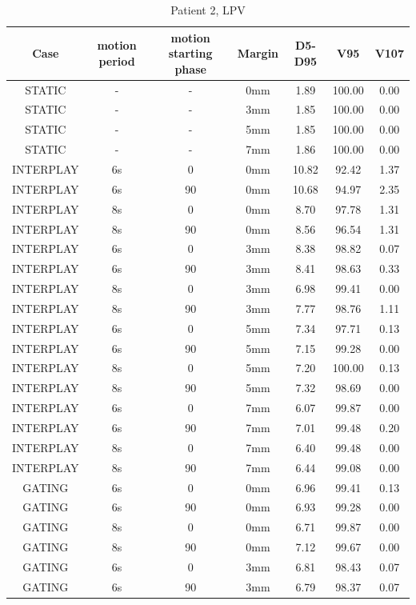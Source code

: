 \documentclass[type=dr, dr=rernat, accentcolor=tud7b,colorbacktitle, bigchapter, openright, twoside, 12pt ]{tudthesis}
\begin{document}
\begin{table}[H]
  \centering
  \caption{Patient 2, LPV}
  \begin{tabular}{|c||c|c|c||c|c|c|}
    \hline\hline
    Case & motion period & motion starting phase & Margin & D5-D95 & V95 & V107\\
    \hline 
STATIC & - & - & 0mm & 1.89 & 100.00 & 0.00 \\
STATIC & - & - & 3mm & 1.85 & 100.00 & 0.00 \\
STATIC & - & - & 5mm & 1.85 & 100.00 & 0.00 \\
STATIC & - & - & 7mm & 1.86 & 100.00 & 0.00 \\
INTERPLAY & 6s & 0 & 0mm & 10.82 & 92.42 & 1.37 \\
INTERPLAY & 6s & 90 & 0mm & 10.68 & 94.97 & 2.35 \\
INTERPLAY & 8s & 0 & 0mm & 8.70 & 97.78 & 1.31 \\
INTERPLAY & 8s & 90 & 0mm & 8.56 & 96.54 & 1.31 \\
INTERPLAY & 6s & 0 & 3mm & 8.38 & 98.82 & 0.07 \\
INTERPLAY & 6s & 90 & 3mm & 8.41 & 98.63 & 0.33 \\
INTERPLAY & 8s & 0 & 3mm & 6.98 & 99.41 & 0.00 \\
INTERPLAY & 8s & 90 & 3mm & 7.77 & 98.76 & 1.11 \\
INTERPLAY & 6s & 0 & 5mm & 7.34 & 97.71 & 0.13 \\
INTERPLAY & 6s & 90 & 5mm & 7.15 & 99.28 & 0.00 \\
INTERPLAY & 8s & 0 & 5mm & 7.20 & 100.00 & 0.13 \\
INTERPLAY & 8s & 90 & 5mm & 7.32 & 98.69 & 0.00 \\
INTERPLAY & 6s & 0 & 7mm & 6.07 & 99.87 & 0.00 \\
INTERPLAY & 6s & 90 & 7mm & 7.01 & 99.48 & 0.20 \\
INTERPLAY & 8s & 0 & 7mm & 6.40 & 99.48 & 0.00 \\
INTERPLAY & 8s & 90 & 7mm & 6.44 & 99.08 & 0.00 \\
GATING & 6s & 0 & 0mm & 6.96 & 99.41 & 0.13 \\
GATING & 6s & 90 & 0mm & 6.93 & 99.28 & 0.00 \\
GATING & 8s & 0 & 0mm & 6.71 & 99.87 & 0.00 \\
GATING & 8s & 90 & 0mm & 7.12 & 99.67 & 0.00 \\
GATING & 6s & 0 & 3mm & 6.81 & 98.43 & 0.07 \\
GATING & 6s & 90 & 3mm & 6.79 & 98.37 & 0.07 \\

\end{tabular}
\end{table}
\end{document}
